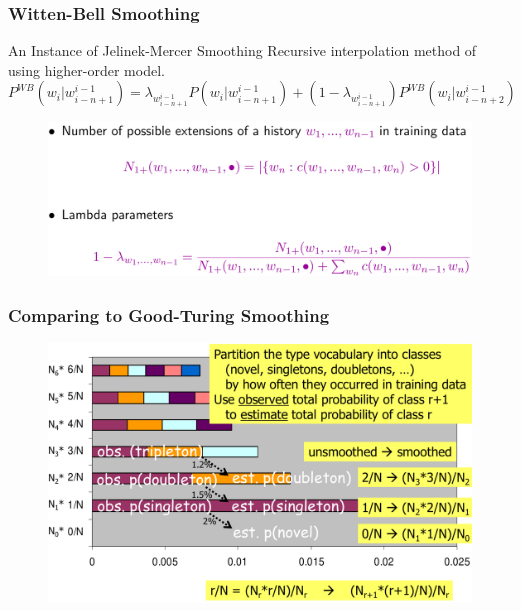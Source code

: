 \documentclass{beamer}
\begin{document}
\begin{frame}\frametitle{Witten-Bell Smoothing}

\begin{block}{An Instance of Jelinek-Mercer Smoothing}
Recursive interpolation method of using higher-order model.
$$
P^{WB}(w_i|w_{i-n+1}^{i-1}) =
\lambda_{w_{i-n+1}^{i-1}}P(w_i|w_{i-n+1}^{i-1}) + (1-\lambda_{w_{i-n+1}^{i-1}})P^{WB}(w_i|w_{i-n+2}^{i-1})
$$
\vspace{-10pt}
\begin{figure}
\includegraphics[width=1\linewidth]{figure/witten_bell_smoothing_equation.pdf}
\end{figure}
\end{block}
\end{frame}








\begin{frame}\frametitle{Comparing to Good-Turing Smoothing}
\begin{figure}
\includegraphics[width=0.9\linewidth]{figure/good_turing_witten_bell.pdf}
\end{figure}
\end{frame}
\end{document}
